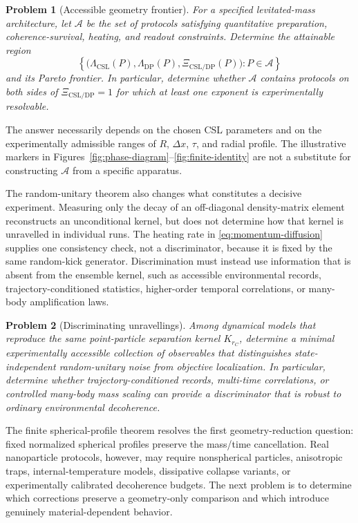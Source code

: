 \documentclass[
  aps,
  prd,
  preprint,
  notitlepage,
  superscriptaddress,
  nofootinbib,
  longbibliography
]{revtex4-2}
\newtheorem{problem}{Problem}
\newcommand{\dx}{\Delta x}
\newcommand{\Krc}{K_{r_C}}
\newcommand{\Xic}{\Xi_{\mathrm{CSL/DP}}}
\begin{document}
\begin{problem}[Accessible geometry frontier]
For a specified levitated-mass architecture, let $\mathcal A$ be the set of protocols satisfying quantitative preparation, coherence-survival, heating, and readout constraints. Determine the attainable region
\[
\left\{\bigl(\Lambda_{\mathrm{CSL}}(P),
\Lambda_{\mathrm{DP}}(P),\Xic(P)\bigr):P\in\mathcal A\right\}
\]
and its Pareto frontier. In particular, determine whether $\mathcal A$ contains protocols on both sides of $\Xic=1$ for which at least one exponent is experimentally resolvable.
\end{problem}

The answer necessarily depends on the chosen CSL parameters and on the experimentally admissible ranges of $R$, $\dx$, $\tau$, and radial profile. The illustrative markers in Figures~\ref{fig:phase-diagram}--\ref{fig:finite-identity} are not a substitute for constructing $\mathcal A$ from a specific apparatus.

The random-unitary theorem also changes what constitutes a decisive experiment. Measuring only the decay of an off-diagonal density-matrix element reconstructs an unconditional kernel, but does not determine how that kernel is unravelled in individual runs. The heating rate in \eqref{eq:momentum-diffusion} supplies one consistency check, not a discriminator, because it is fixed by the same random-kick generator. Discrimination must instead use information that is absent from the ensemble kernel, such as accessible environmental records, trajectory-conditioned statistics, higher-order temporal correlations, or many-body amplification laws.

\begin{problem}[Discriminating unravellings]
Among dynamical models that reproduce the same point-particle separation kernel $\Krc$, determine a minimal experimentally accessible collection of observables that distinguishes state-independent random-unitary noise from objective localization. In particular, determine whether trajectory-conditioned records, multi-time correlations, or controlled many-body mass scaling can provide a discriminator that is robust to ordinary environmental decoherence.
\end{problem}

The finite spherical-profile theorem resolves the first geometry-reduction question: fixed normalized spherical profiles preserve the mass/time cancellation. Real nanoparticle protocols, however, may require nonspherical particles, anisotropic traps, internal-temperature models, dissipative collapse variants, or experimentally calibrated decoherence budgets. The next problem is to determine which corrections preserve a geometry-only comparison and which introduce genuinely material-dependent behavior.
\end{document}

